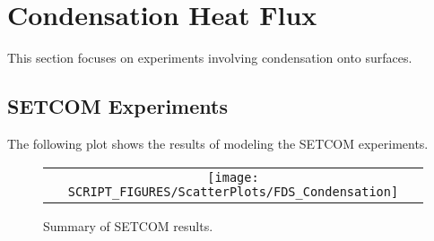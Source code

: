\clearpage

\section{Condensation Heat Flux}
\label{Condensation}
This section focuses on experiments involving condensation onto surfaces.

\subsection{SETCOM Experiments}
The following plot shows the results of modeling the SETCOM experiments.

\begin{figure}[h!]
	\begin{center}
		\begin{tabular}{c}
			\texttt{[image: SCRIPT\_FIGURES/ScatterPlots/FDS\_Condensation]}
		\end{tabular}
	\end{center}
	\caption[Summary of SETCOM results]{Summary of SETCOM results.}
	\label{SETCOM_summary}
\end{figure}

